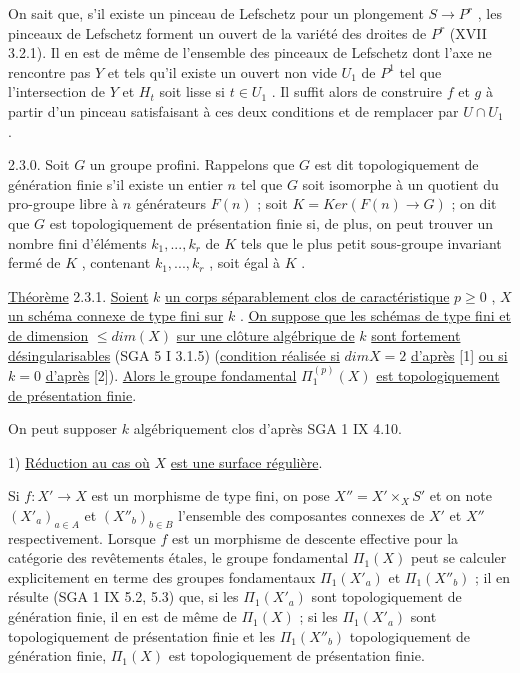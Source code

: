 On sait que, s'il existe un pinceau de Lefschetz pour un plongement $S \longrightarrow P^r$ , les pinceaux de Lefschetz forment un ouvert de la variété des droites de $P^r$ (XVII 3.2.1). Il en est de même de l'ensemble des pinceaux de Lefschetz dont l'axe ne rencontre pas $Y$ et tels qu'il existe un ouvert non vide $U_1$ de $P^1$ tel que l'intersection de $Y$ et $H_t$ soit lisse si $t \in U_1$ . Il suffit alors de construire $f$ et $g$ à partir d'un pinceau satisfaisant à ces deux conditions et de remplacer par $U \cap U_1$ .

2.3.0. Soit $G$ un groupe profini. Rappelons que $G$ est dit topologiquement de génération finie s'il existe un entier $n$ tel que $G$ soit isomorphe à un quotient du pro-groupe libre à $n$ générateurs $F(n)$ ; soit $K = Ker(F(n) \longrightarrow G)$ ; on dit que $G$ est topologiquement de présentation finie si, de plus, on peut trouver un nombre fini d'éléments $k_1,...,k_r$ de $K$ tels que le plus petit sous-groupe invariant fermé de $K$ , contenant $k_1,...,k_r$ , soit égal à $K$ .

\underline{Théorème} 2.3.1. \underline{Soient} $k$ \underline{un corps séparablement clos de caractéristique} $p \geqslant 0$ , $X$ \underline{un schéma connexe de type fini sur} $k$ . \underline{On suppose que les schémas de type fini et de dimension} $\leqslant dim(X)$ \underline{sur une clôture algébrique de} $k$ \underline{sont fortement désingularisables} (SGA 5 I 3.1.5) (\underline{condition réalisée si} $dim X = 2$ \underline{d'après} [1] \underline{ou si} $k = 0$ \underline{d'après} [2]). \underline{Alors le groupe fondamental} $\Pi_1^{(p)}(X)$ \underline{est topologiquement de présentation finie}.

On peut supposer $k$ algébriquement clos d'après SGA 1 IX 4.10.


1) \underline{Réduction au cas où} $X$ \underline{est une surface régulière}.

Si $f : X' \longrightarrow X$ est un morphisme de type fini, on pose $X'' = X'\times_X S'$ et on note $(X'_a)_{a \in A}$ et $(X''_b)_{b \in B}$ l'ensemble des composantes connexes de $X'$ et $X''$ respectivement. Lorsque $f$ est un morphisme de descente effective pour la catégorie des revêtements étales, le groupe fondamental $\Pi_1(X)$ peut se calculer explicitement
en terme des groupes fondamentaux $\Pi_1(X'_a)$ et $\Pi_1(X''_b)$ ; il en résulte (SGA 1 IX 5.2, 5.3) que, si les $\Pi_1(X'_a)$ sont topologiquement de génération finie, il en est de même de $\Pi_1(X)$ ; si les $\Pi_1(X'_a)$ sont topologiquement de présentation finie et les $\Pi_1(X''_b)$ topologiquement de génération finie, $\Pi_1(X)$ est topologiquement de présentation finie.

